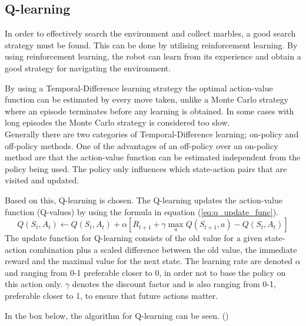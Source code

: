 \documentclass[../Head/Main.tex]{subfiles}
\begin{document}
\subsection{Q-learning}
In order to effectively search the environment and collect marbles, a good search strategy must be found. This can be done by utilising reinforcement learning. By using reinforcement learning, the robot can learn from its experience and obtain a good strategy for navigating the environment.\par
By using a Temporal-Difference learning strategy the optimal action-value function can be estimated by every move taken, unlike a Monte Carlo strategy where an episode terminates before any learning is obtained. In some cases with long episodes the Monte Carlo strategy is considered too slow.\\
Generally there are two categories of Temporal-Difference learning; on-policy and off-policy methods. One of the advantages of an off-policy over an on-policy method are that the action-value function can be estimated independent from the policy being used. The policy only influences which state-action pairs that are visited and updated.\par 
Based on this, Q-learning is chosen. The Q-learning updates the action-value function (Q-values) by using the formula in equation (\ref{eq:q_update_func}).
\begin{equation}\label{eq:q_update_func}
Q\left(S_t,A_t\right) \leftarrow Q\left(S_t,A_t\right) + \alpha\left[R_{t+1}+\gamma\max_a Q\left(S_{t+1},a\right)-Q\left(S_t,A_t\right)\right]
\end{equation}
The update function for Q-learning consists of the old value for a given state-action combination plus a scaled difference between the old value, the immediate reward and the maximal value for the next state. The learning rate are denoted $\alpha$ and ranging from 0-1 preferable closer to 0, in order not to base the policy on this action only. $\gamma$ denotes the discount factor and is also ranging from 0-1, preferable closer to 1, to ensure that future actions matter.\par
In the box below, the algorithm for Q-learning can be seen. (\cite[131-136]{RL})

\end{document}
